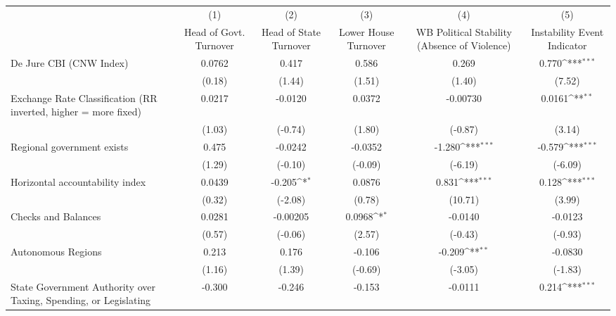{
\def\sym#1{\ifmmode^{#1}\else\(^{#1}\)\fi}
\begin{tabular}{l*{5}{c}}
\hline\hline
                &\multicolumn{1}{c}{(1)}&\multicolumn{1}{c}{(2)}&\multicolumn{1}{c}{(3)}&\multicolumn{1}{c}{(4)}&\multicolumn{1}{c}{(5)}\\
                &\multicolumn{1}{c}{Head of Govt. Turnover}&\multicolumn{1}{c}{Head of State Turnover}&\multicolumn{1}{c}{Lower House Turnover}&\multicolumn{1}{c}{WB Political Stability (Absence of Violence)}&\multicolumn{1}{c}{Instability Event Indicator}\\
\hline
De Jure CBI (CNW Index)&   0.0762         &    0.417         &    0.586         &    0.269         &    0.770\sym{***}\\
                &   (0.18)         &   (1.44)         &   (1.51)         &   (1.40)         &   (7.52)         \\
[1em]
Exchange Rate Classification (RR inverted, higher = more fixed)&   0.0217         &  -0.0120         &   0.0372         & -0.00730         &   0.0161\sym{**} \\
                &   (1.03)         &  (-0.74)         &   (1.80)         &  (-0.87)         &   (3.14)         \\
[1em]
Regional government exists   &    0.475         &  -0.0242         &  -0.0352         &   -1.280\sym{***}&   -0.579\sym{***}\\
                &   (1.29)         &  (-0.10)         &  (-0.09)         &  (-6.19)         &  (-6.09)         \\
[1em]
Horizontal accountability index&   0.0439         &   -0.205\sym{*}  &   0.0876         &    0.831\sym{***}&    0.128\sym{***}\\
                &   (0.32)         &  (-2.08)         &   (0.78)         &  (10.71)         &   (3.99)         \\
[1em]
Checks and Balances&   0.0281         & -0.00205         &   0.0968\sym{*}  &  -0.0140         &  -0.0123         \\
                &   (0.57)         &  (-0.06)         &   (2.57)         &  (-0.43)         &  (-0.93)         \\
[1em]
Autonomous Regions&    0.213         &    0.176         &   -0.106         &   -0.209\sym{**} &  -0.0830         \\
                &   (1.16)         &   (1.39)         &  (-0.69)         &  (-3.05)         &  (-1.83)         \\
[1em]
State Government Authority over Taxing, Spending, or Legislating&   -0.300         &   -0.246         &   -0.153         &  -0.0111         &    0.214\sym{***}\\

\end{tabular}}
